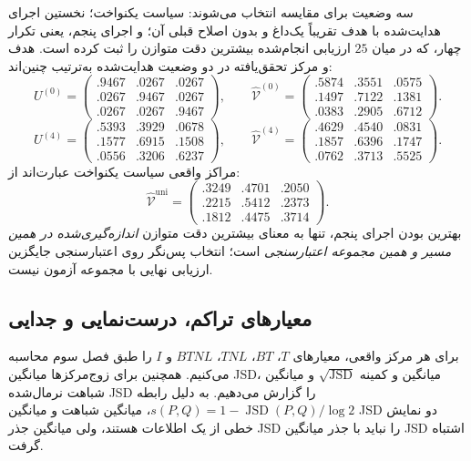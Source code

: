 سه وضعیت برای مقایسه انتخاب می‌شوند: سیاست یکنواخت؛ نخستین اجرای هدایت‌شده با هدف تقریباً یک‌داغ و بدون اصلاح قبلی آن؛ و اجرای پنجم، یعنی تکرار چهار، که در میان $25$ ارزیابی انجام‌شده بیشترین دقت متوازن را ثبت کرده است. هدف و مرکز تحقق‌یافته در دو وضعیت هدایت‌شده به‌ترتیب چنین‌اند:
\begin{equation}\label{eq:ch4-center-observation-target-first}
U^{(0)}=\begin{pmatrix}
.9467&.0267&.0267\\ .0267&.9467&.0267\\ .0267&.0267&.9467
\end{pmatrix},\qquad
\widehat{\mathcal V}^{(0)}=\begin{pmatrix}
.5874&.3551&.0575\\ .1497&.7122&.1381\\ .0383&.2905&.6712
\end{pmatrix}.
\end{equation}
\begin{equation}\label{eq:ch4-center-observation-target-best}
U^{(4)}=\begin{pmatrix}
.5393&.3929&.0678\\ .1577&.6915&.1508\\ .0556&.3206&.6237
\end{pmatrix},\qquad
\widehat{\mathcal V}^{(4)}=\begin{pmatrix}
.4629&.4540&.0831\\ .1857&.6396&.1747\\ .0762&.3713&.5525
\end{pmatrix}.
\end{equation}
مراکز واقعی سیاست یکنواخت عبارت‌اند از:
\begin{equation}\label{eq:ch4-center-observation-uniform}
\widehat{\mathcal V}^{\mathrm{uni}}=\begin{pmatrix}
.3249&.4701&.2050\\ .2215&.5412&.2373\\ .1812&.4475&.3714
\end{pmatrix}.
\end{equation}
بهترین بودن اجرای پنجم، تنها به معنای بیشترین دقت متوازن \emph{اندازه‌گیری‌شده در همین مسیر و همین مجموعه اعتبارسنجی} است؛ انتخاب پس‌نگر روی اعتبارسنجی جایگزین ارزیابی نهایی با مجموعه آزمون نیست.

\subsection{معیارهای تراکم، درست‌نمایی و جدایی}
\label{subsec:ch4-center-observation-metrics}
برای هر مرکز واقعی، معیارهای $T$، $BT$، $TNL$، $BTNL$ و $I$ را طبق فصل سوم محاسبه می‌کنیم. همچنین برای زوج‌مرکزها میانگین JSD، میانگین و کمینه $\sqrt{\operatorname{JSD}}$ و میانگین شباهت نرمال‌شده JSD را گزارش می‌دهیم. به دلیل رابطه $s(P,Q)=1-\operatorname{JSD}(P,Q)/\log 2$، میانگین شباهت و میانگین JSD دو نمایش خطی از یک اطلاعات هستند، ولی میانگین جذر JSD را نباید با جذر میانگین JSD اشتباه گرفت.

